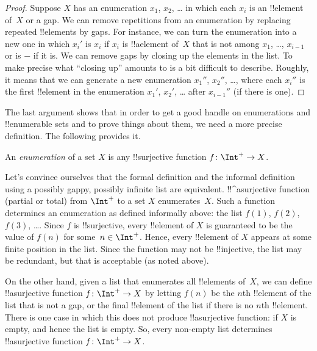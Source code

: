 \documentclass[../../../include/open-logic-section]{subfiles}
\begin{document}
\begin{proof}
  Suppose $X$ has an enumeration $x_1$, $x_2$, \dots{} in which each
  $x_i$ is an !!{element} of~$X$ or a gap.  We can remove repetitions
  from an enumeration by replacing repeated !!{element}s by gaps. For
  instance, we can turn the enumeration into a new one in which $x_i'$
  is $x_i$ if $x_i$ is !!a{element} of~$X$ that is not among $x_1$,
  \dots, $x_{i-1}$ or is $-$ if it is. We can remove gaps by closing
  up the elements in the list. To make precise what ``closing up''
  amounts to is a bit difficult to describe. Roughly, it means that we
  can generate a new enumeration $x_1''$, $x_2''$, \dots, where each
  $x_i''$ is the first !!{element} in the enumeration $x_1'$, $x_2'$,
  \dots{} after $x_{i-1}''$ (if there is one).
\end{proof}

The last argument shows that in order to get a good handle on
enumerations and !!{enumerable} sets and to prove things about them,
we need a more precise definition.  The following provides it.

\begin{defn}[Enumeration]
An \emph{enumeration} of a set $X$ is any !!{surjective} function
$f \colon \Int^+ \to X$.
\end{defn}

\begin{explain}
Let's convince ourselves that the formal definition and the informal
definition using a possibly gappy, possibly infinite list are
equivalent. !!^a{surjective} function (partial or total) from $\Int^+$
to a set $X$ enumerates~$X$. Such a function determines an enumeration
as defined informally above: the list $f(1)$, $f(2)$, $f(3)$,
\dots. Since $f$ is !!{surjective}, every !!{element} of $X$ is
guaranteed to be the value of $f(n)$ for some~$n \in \Int^+$. Hence,
every !!{element} of $X$ appears at some finite position in the
list. Since the function may not be !!{injective}, the list may be
redundant, but that is acceptable (as noted above).

On the other hand, given a list that enumerates all !!{element}s
of~$X$, we can define !!a{surjective} function $f\colon \Int^+ \to X$ by
letting $f(n)$ be the $n$th !!{element} of the list that is not a gap,
or the final !!{element} of the list if there is no $n$th !!{element}.
There is one case in which this does not produce !!a{surjective}
function: if $X$ is empty, and hence the list is empty. So, every
non-empty list determines !!a{surjective} function $f\colon \Int^+ \to
X$.
\end{explain}
\end{document}
